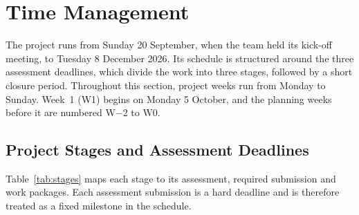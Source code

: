 \section{Time Management}\label{sec:time}


The project runs from Sunday 20 September, when the team held its kick-off meeting, to Tuesday 8 December 2026. Its schedule is structured around the three \unitcode{} assessment deadlines, which divide the work into three stages, followed by a short closure period. Throughout this section, project weeks run from Monday to Sunday. Week~1 (W1) begins on Monday 5 October, and the planning weeks before it are numbered W$-$2 to W0.

\subsection{Project Stages and Assessment Deadlines}\label{sec:stages}

Table~\ref{tab:stages} maps each stage to its assessment, required submission and work packages. Each assessment submission is a hard deadline and is therefore treated as a fixed milestone in the schedule.

